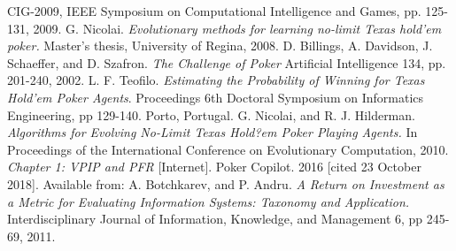 \begin{thebibliography}{9}
CIG-2009, IEEE Symposium on Computational Intelligence and Games, pp. 125-131, 2009.
G. Nicolai.
\textit{Evolutionary methods for learning no-limit Texas hold'em poker.} Master's thesis, University of Regina, 2008.
D. Billings, A. Davidson, J. Schaeffer, and D. Szafron.
\textit{The Challenge of Poker}
Artificial Intelligence 134, pp. 201-240, 2002.
L. F. Teofilo.
\textit{Estimating the Probability of Winning for Texas Hold'em Poker Agents}.
Proceedings 6th Doctoral Symposium on Informatics Engineering, pp 129-140. Porto, Portugal.
G. Nicolai, and R. J. Hilderman.
\textit{Algorithms for Evolving No-Limit Texas Hold?em Poker Playing Agents.}
In Proceedings of the International Conference on Evolutionary Computation, 2010.
\textit{Chapter 1: VPIP and PFR} [Internet]. Poker Copilot. 2016 [cited 23 October 2018]. Available from: \href{https://pokercopilot.com/poker-statistics/vpip-pfr}{} 
A. Botchkarev, and P. Andru.
\textit{A Return on Investment as a Metric for Evaluating Information Systems: Taxonomy and Application.}  Interdisciplinary Journal of Information, Knowledge, and Management 6, pp 245-69, 2011.
\end{thebibliography}

